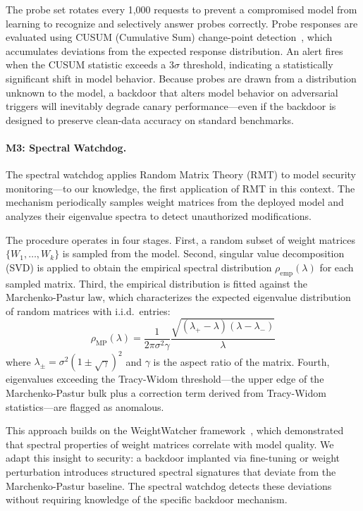 The probe set rotates every 1{,}000 requests to prevent a compromised model
from learning to recognize and selectively answer probes correctly. Probe
responses are evaluated using CUSUM (Cumulative Sum) change-point
detection~\cite{page1954}, which accumulates deviations from the expected
response distribution. An alert fires when the CUSUM statistic exceeds a
$3\sigma$ threshold, indicating a statistically significant shift in model
behavior. Because probes are drawn from a distribution unknown to the model,
a backdoor that alters model behavior on adversarial triggers will
inevitably degrade canary performance---even if the backdoor is designed to
preserve clean-data accuracy on standard benchmarks.

\paragraph{M3: Spectral Watchdog.}
The spectral watchdog applies Random Matrix Theory (RMT) to model security
monitoring---to our knowledge, the first application of RMT in this context.
The mechanism periodically samples weight matrices from the deployed model
and analyzes their eigenvalue spectra to detect unauthorized modifications.

The procedure operates in four stages. First, a random subset of weight
matrices $\{W_1, \ldots, W_k\}$ is sampled from the model. Second, singular
value decomposition (SVD) is applied to obtain the empirical spectral
distribution $\rho_{\text{emp}}(\lambda)$ for each sampled matrix. Third,
the empirical distribution is fitted against the Marchenko-Pastur law, which
characterizes the expected eigenvalue distribution of random matrices with
i.i.d.\ entries:
\[
  \rho_{\text{MP}}(\lambda) = \frac{1}{2\pi \sigma^2 \gamma}
  \frac{\sqrt{(\lambda_+ - \lambda)(\lambda - \lambda_-)}}{\lambda}
\]
where $\lambda_\pm = \sigma^2(1 \pm \sqrt{\gamma})^2$ and $\gamma$ is the
aspect ratio of the matrix. Fourth, eigenvalues exceeding the Tracy-Widom
threshold---the upper edge of the Marchenko-Pastur bulk plus a correction
term derived from Tracy-Widom statistics---are flagged as anomalous.

This approach builds on the WeightWatcher framework~\cite{martin2021},
which demonstrated that spectral properties of weight matrices correlate
with model quality. We adapt this insight to security: a backdoor implanted
via fine-tuning or weight perturbation introduces structured spectral
signatures that deviate from the Marchenko-Pastur baseline. The spectral
watchdog detects these deviations without requiring knowledge of the
specific backdoor mechanism.

